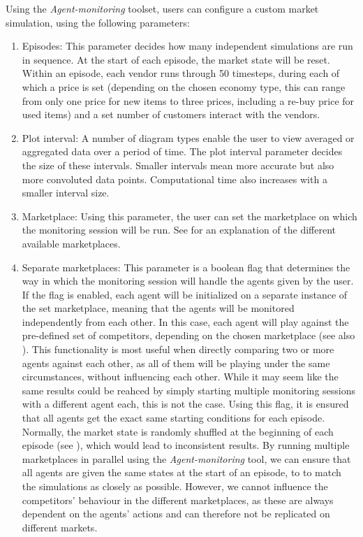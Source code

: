 Using the \emph{Agent-monitoring} toolset, users can configure a custom market simulation, using the following parameters:

\begin{enumerate}
	\item Episodes: This parameter decides how many independent simulations are run in sequence. At the start of each episode, the market state will be reset. Within an episode, each vendor runs through 50 timesteps, during each of which a price is set (depending on the chosen economy type, this can range from only one price for new items to three prices, including a re-buy price for used items) and a set number of customers interact with the vendors.
	\item Plot interval: A number of diagram types enable the user to view averaged or aggregated data over a period of time. The plot interval parameter decides the size of these intervals. Smaller intervals mean more accurate but also more convoluted data points. Computational time also increases with a smaller interval size.
	\item Marketplace: Using this parameter, the user can set the marketplace on which the monitoring session will be run. See  for an explanation of the different available marketplaces.
	\item Separate marketplaces: This parameter is a boolean flag that determines the way in which the monitoring session will handle the agents given by the user. If the flag is enabled, each agent will be initialized on a separate instance of the set marketplace, meaning that the agents will be monitored independently from each other. In this case, each agent will play against the pre-defined set of competitors, depending on the chosen marketplace (see also ). This functionality is most useful when directly comparing two or more agents against each other, as all of them will be playing under the same circumstances, without influencing each other. While it may seem like the same results could be reahced by simply starting multiple monitoring sessions with a different agent each, this is not the case. Using this flag, it is ensured that all agents get the exact same starting conditions for each episode. Normally, the market state is randomly shuffled at the beginning of each episode (see ), which would lead to inconsistent results. By running multiple marketplaces in parallel using the \emph{Agent-monitoring} tool, we can ensure that all agents are given the same states at the start of an episode, to to match the simulations as closely as possible. However, we cannot influence the competitors' behaviour in the different marketplaces, as these are always dependent on the agents' actions and can therefore not be replicated on different markets.

\end{enumerate}
